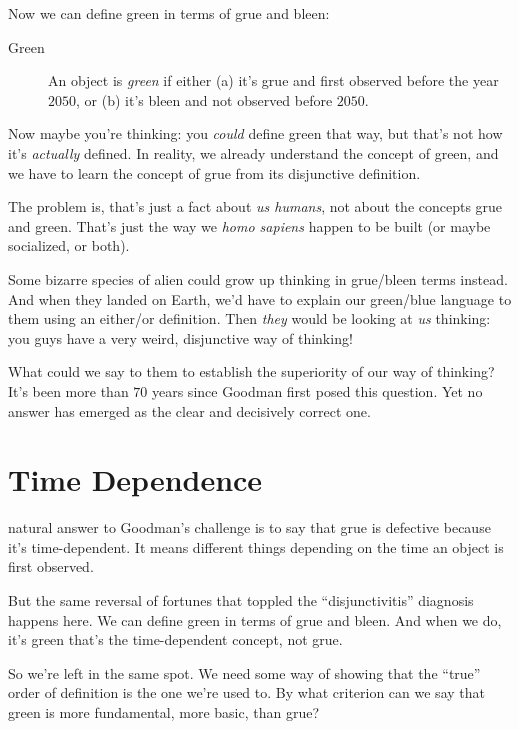 \documentclass[justified]{tufte-book}
\theoremstyle{definition}
\theoremstyle{definition}
\theoremstyle{definition}
\theoremstyle{remark}
\begin{document}
Now we can define green in terms of grue and bleen:

\begin{description}
\item[Green]
An object is \emph{green} if either (a) it's grue and first observed before the year \(2050\), or (b) it's bleen and not observed before \(2050\).
\end{description}

Now maybe you're thinking: you \emph{could} define green that way, but that's not how it's \emph{actually} defined. In reality, we already understand the concept of green, and we have to learn the concept of grue from its disjunctive definition.

The problem is, that's just a fact about \emph{us humans}, not about the concepts grue and green. That's just the way we \emph{homo sapiens} happen to be built (or maybe socialized, or both).

Some bizarre species of alien could grow up thinking in grue/bleen terms instead. And when they landed on Earth, we'd have to explain our green/blue language to them using an either/or definition. Then \emph{they} would be looking at \emph{us} thinking: you guys have a very weird, disjunctive way of thinking!

What could we say to them to establish the superiority of our way of thinking? It's been more than \(70\) years since Goodman first posed this question. Yet no answer has emerged as the clear and decisively correct one.

\hypertarget{time-dependence}{%
\section*{Time Dependence}\label{time-dependence}}

 natural answer to Goodman's challenge is to say that grue is defective because it's time-dependent. It means different things depending on the time an object is first observed.

But the same reversal of fortunes that toppled the ``disjunctivitis'' diagnosis happens here. We can define green in terms of grue and bleen. And when we do, it's green that's the time-dependent concept, not grue.

So we're left in the same spot. We need some way of showing that the ``true'' order of definition is the one we're used to. By what criterion can we say that green is more fundamental, more basic, than grue?
\end{document}
